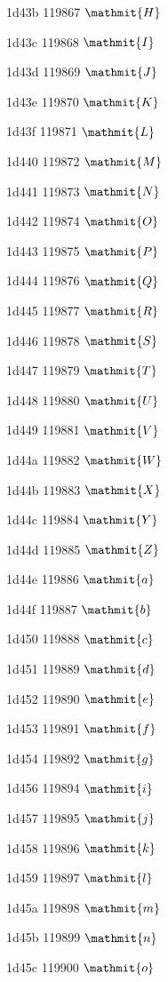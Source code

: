 \documentclass[11pt]{article}
\begin{document}
1d43b 119867 \ensuremath{\mathmit{H}}

1d43c 119868 \ensuremath{\mathmit{I}}

1d43d 119869 \ensuremath{\mathmit{J}}

1d43e 119870 \ensuremath{\mathmit{K}}

1d43f 119871 \ensuremath{\mathmit{L}}

1d440 119872 \ensuremath{\mathmit{M}}

1d441 119873 \ensuremath{\mathmit{N}}

1d442 119874 \ensuremath{\mathmit{O}}

1d443 119875 \ensuremath{\mathmit{P}}

1d444 119876 \ensuremath{\mathmit{Q}}

1d445 119877 \ensuremath{\mathmit{R}}

1d446 119878 \ensuremath{\mathmit{S}}

1d447 119879 \ensuremath{\mathmit{T}}

1d448 119880 \ensuremath{\mathmit{U}}

1d449 119881 \ensuremath{\mathmit{V}}

1d44a 119882 \ensuremath{\mathmit{W}}

1d44b 119883 \ensuremath{\mathmit{X}}

1d44c 119884 \ensuremath{\mathmit{Y}}

1d44d 119885 \ensuremath{\mathmit{Z}}

1d44e 119886 \ensuremath{\mathmit{a}}

1d44f 119887 \ensuremath{\mathmit{b}}

1d450 119888 \ensuremath{\mathmit{c}}

1d451 119889 \ensuremath{\mathmit{d}}

1d452 119890 \ensuremath{\mathmit{e}}

1d453 119891 \ensuremath{\mathmit{f}}

1d454 119892 \ensuremath{\mathmit{g}}

1d456 119894 \ensuremath{\mathmit{i}}

1d457 119895 \ensuremath{\mathmit{j}}

1d458 119896 \ensuremath{\mathmit{k}}

1d459 119897 \ensuremath{\mathmit{l}}

1d45a 119898 \ensuremath{\mathmit{m}}

1d45b 119899 \ensuremath{\mathmit{n}}

1d45c 119900 \ensuremath{\mathmit{o}}
\end{document}
